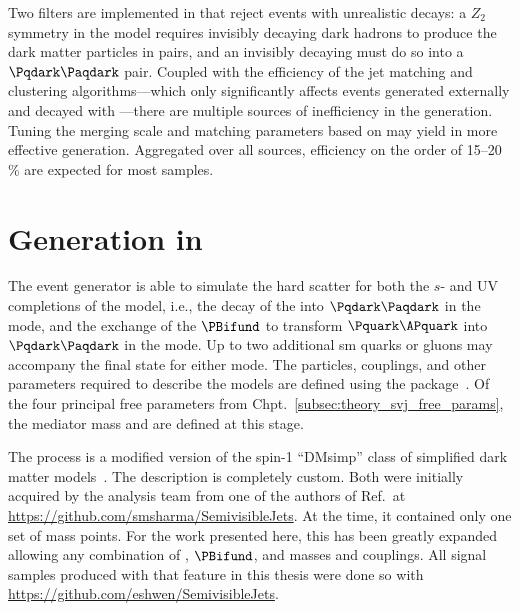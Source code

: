Two filters are implemented in \PYTHIA that reject events with unrealistic decays: a $Z_2$ symmetry in the model requires invisibly decaying dark hadrons to produce the dark matter particles in pairs, and an invisibly decaying \PZprime must do so into a $\Pqdark\Paqdark$ pair. Coupled with the efficiency of the \gls{jet} matching and clustering algorithms---which only significantly affects events generated externally and decayed with \PYTHIA---there are multiple sources of inefficiency in the generation. Tuning the merging scale and matching parameters based on \rinv may yield in more effective generation. Aggregated over all sources, efficiency on the order of 15--20\,\% are expected for most \MADGRAPH samples.




\section{Generation in \texorpdfstring{\MADGRAPH}{MadGraph}}
\label{sec:svj_signal_madgraph}

The \MADGRAPHFULL event generator is able to simulate the hard scatter for both the $s$- and \tchannel UV completions of the model, i.e., the decay of the \PZprime into $\Pqdark\Paqdark$ in the \schannel mode, and the exchange of the $\PBifund$ to transform $\Pquark\APquark$ into $\Pqdark\Paqdark$ in the \tchannel mode. Up to two additional \acrlong{sm} quarks or gluons may accompany the final state for either mode. The particles, couplings, and other parameters required to describe the models are defined using the \FEYNRULES package~\cite{Alloul:2013bka}. Of the four principal free parameters from Chpt.~\ref{subsec:theory_svj_free_params}, the mediator mass and \mqdark are defined at this stage.

The \schannel process is a modified version of the spin-1 ``DMsimp'' class of simplified dark matter models~\cite{Backovic:2015soa}. The \tchannel description is completely custom. Both were initially acquired by the analysis team from one of the authors of Ref.~at \url{https://github.com/smsharma/SemivisibleJets}. At the time, it contained only one set of mass points. For the work presented here, this has been greatly expanded allowing any combination of \PZprime, $\PBifund$, and \Pqdark masses and couplings. All signal samples produced with \MADGRAPH that feature in this thesis were done so with \url{https://github.com/eshwen/SemivisibleJets}. %

